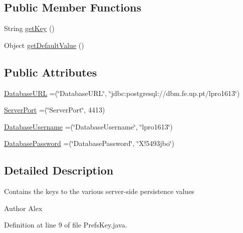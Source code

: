 \subsection*{Public Member Functions}
\begin{DoxyCompactItemize}
\item 
String \hyperlink{enumpt_1_1up_1_1fe_1_1lpro1613_1_1server_1_1other_1_1_prefs_key_ab78cc090bf215b90b4387473ae17524a}{get\+Key} ()
\item 
Object \hyperlink{enumpt_1_1up_1_1fe_1_1lpro1613_1_1server_1_1other_1_1_prefs_key_ab8700091048a80f746647cebab8a1876}{get\+Default\+Value} ()
\end{DoxyCompactItemize}
\subsection*{Public Attributes}
\begin{DoxyCompactItemize}
\item 
\hyperlink{enumpt_1_1up_1_1fe_1_1lpro1613_1_1server_1_1other_1_1_prefs_key_a2805e6e6a98551242a1f0d86fc55a156}{Database\+U\+RL} =(\char`\"{}Database\+U\+RL\char`\"{}, \char`\"{}jdbc\+:postgresql\+://dbm.\+fe.\+up.\+pt/lpro1613\char`\"{})
\item 
\hyperlink{enumpt_1_1up_1_1fe_1_1lpro1613_1_1server_1_1other_1_1_prefs_key_a92ee06ea77e828cd8272275f9309e142}{Server\+Port} =(\char`\"{}Server\+Port\char`\"{}, 4413)
\item 
\hyperlink{enumpt_1_1up_1_1fe_1_1lpro1613_1_1server_1_1other_1_1_prefs_key_a1f5081d54a2b9ebb5e46de69a24b9853}{Database\+Username} =(\char`\"{}Database\+Username\char`\"{}, \char`\"{}lpro1613\char`\"{})
\item 
\hyperlink{enumpt_1_1up_1_1fe_1_1lpro1613_1_1server_1_1other_1_1_prefs_key_a47cf4dbfe663d670dceb3ca51b4e4f79}{Database\+Password} =(\char`\"{}Database\+Password\char`\"{}, \char`\"{}X!5493jbo\char`\"{})
\end{DoxyCompactItemize}


\subsection{Detailed Description}
Contains the keys to the various server-\/side persistence values \begin{DoxyAuthor}{Author}
Alex 
\end{DoxyAuthor}


Definition at line 9 of file Prefs\+Key.\+java.



